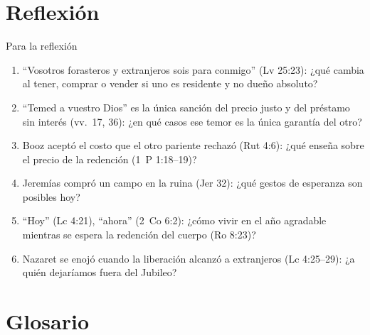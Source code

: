 \documentclass[hyperref={bookmarks=false},aspectratio=169]{beamer}
\begin{document}
\section{Reflexión}

\begin{frame}{Para la reflexión}
\small
\begin{enumerate}
\item ``Vosotros forasteros y extranjeros sois para conmigo'' (Lv 25:23): ¿qué cambia al tener, comprar o vender si uno es residente y no dueño absoluto?
\item ``Temed a vuestro Dios'' es la única sanción del precio justo y del préstamo sin interés (vv.~17, 36): ¿en qué casos ese temor es la única garantía del otro?
\item Booz aceptó el costo que el otro pariente rechazó (Rut 4:6): ¿qué enseña sobre el precio de la redención (1~P 1:18--19)?
\item Jeremías compró un campo en la ruina (Jer 32): ¿qué gestos de esperanza son posibles hoy?
\item ``Hoy'' (Lc 4:21), ``ahora'' (2~Co 6:2): ¿cómo vivir en el año agradable mientras se espera la redención del cuerpo (Ro 8:23)?
\item Nazaret se enojó cuando la liberación alcanzó a extranjeros (Lc 4:25--29): ¿a quién dejaríamos fuera del Jubileo?
\end{enumerate}
\end{frame}

\section{Glosario}
\end{document}
